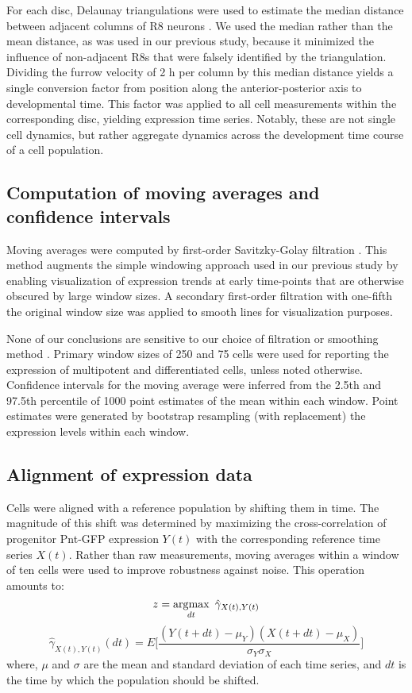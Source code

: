 For each disc, Delaunay triangulations were used to estimate the median distance between adjacent columns of R8 neurons \cite{Fortune1992}. We used the median rather than the mean distance, as was used in our previous study, because it minimized the influence of non-adjacent R8s that were falsely identified by the triangulation. Dividing the furrow velocity of 2 h per column by this median distance yields a single conversion factor from position along the anterior-posterior axis to developmental time. This factor was applied to all cell measurements within the corresponding disc, yielding expression time series. Notably, these are not single cell dynamics, but rather aggregate dynamics across the development time course of a cell population.

\subsection{Computation of moving averages and confidence intervals}
\label{appendix:methods:ratio:moving_averages}

Moving averages were computed by first-order Savitzky-Golay filtration \cite{Savitzky1964}. This method augments the simple windowing approach used in our previous study \cite{Pelaez2015a} by enabling visualization of expression trends at early time-points that are otherwise obscured by large window sizes. A secondary first-order filtration with one-fifth the original window size was applied to smooth lines for visualization purposes.

None of our conclusions are sensitive to our choice of filtration or smoothing method \cite{Pelaez2015a}. Primary window sizes of 250 and 75 cells were used for reporting the expression of multipotent and differentiated cells, unless noted otherwise. Confidence intervals for the moving average were inferred from the 2.5th and 97.5th percentile of 1000 point estimates of the mean within each window. Point estimates were generated by bootstrap resampling (with replacement) the expression levels within each window.

\subsection{Alignment of expression data}
\label{appendix:methods:ratio:alignment}

Cells were aligned with a reference population by shifting them in time. The magnitude of this shift was determined by maximizing the cross-correlation of progenitor Pnt-GFP expression $Y(t)$ with the corresponding reference time series $X(t)$. Rather than raw measurements, moving averages within a window of ten cells were used to improve robustness against noise. This operation amounts to:
\begin{equation}
z = \argmax_{dt} \ {\hat{\gamma}_{X(t),Y(t)}}
\end{equation}
\begin{equation}
\hat{\gamma}_{X(t),Y(t)} (dt) = E \Big[ \frac{(Y(t+dt)-\mu_Y)(X(t+dt)-\mu_X)}{\sigma_Y \sigma_X} \Big]
\end{equation}
where, $\mu$ and $\sigma$ are the mean and standard deviation of each time series, and $dt$ is the time by which the population should be shifted.

